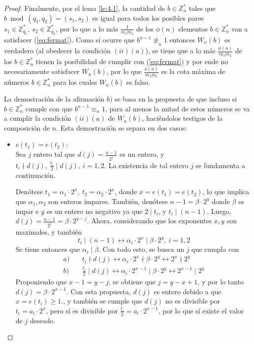 \documentclass[hidelinks, 12pt]{article}
\newcommand{\Zs}{\mathbb{Z}^*}
\newcommand{\llra}{\longleftrightarrow}
\begin{document}
\begin{proof}
    Finalmente, por el lema \ref{le:4.1}, la cantidad de $b\in\Zs_n$ tales que $b\bmod(q_1,q_2)=(s_1,s_2)$ es igual para todos los posibles pares $s_1\in\Zs_{q_1},~s_2\in\Zs_{q_2}$, por lo que a lo más $\frac{1}{m_1m_2}$ de los $\phi(n)$ elementos $b\in\Zs_n$ van a satisfacer (\ref{eq:fermat}). Como si ocurre que $b^{n-1}\not\equiv_n 1$ entonces $W_n(b)$ es verdadero (al obedecer la condición $(ii)(a)$), se tiene que a lo más $\frac{\phi(n)}{m_1m_2}$ de los $b\in\Zs_n$ tienen la posibilidad de cumplir con (\ref{eq:fermat}) y por ende no necesariamente satisfacer $W_n(b)$, por lo que $\frac{\phi(n)}{m_1m_2}$ es la cota máxima de números $b\in\Zs_n$ para los cuales $W_n(b)$ es falso.

    La demostración de la afirmación $b)$ se basa en la propuesta de que incluso si $b\in\Zs_n$ cumple con que $b^{n-1}\equiv_n 1$, para al menos la mitad de estos números se va a cumplir la condición $(ii)(a)$ de $W_n(b)$, haciéndolos testigos de la composición de $n$. Esta demostración se separa en dos casos:
    \begin{itemize}
        \item $e(t_1)=e(t_2)$: \\
        Sea $j$ entero tal que $d(j)=\frac{n-1}{2^j}$ es un entero, y $t_i\nmid d(j),~\frac{t_i}{2}\mid d(j),~i=1,2$. La existencia de tal entero $j$ se fundamenta a continuación.
        
        Denótese $t_1=\alpha_1\cdot 2^x,~t_2=\alpha_2\cdot 2^x$, donde $x=e(t_1)=e(t_2)$, lo que implica que $\alpha_1,\alpha_2$ son enteros impares. También, denótese $n-1=\beta\cdot 2^y$ donde $\beta$ es impar e $y$ es un entero no negativo ya que $2\mid t_i$, y $t_i\mid(n-1)$. Luego, $d(j)=\frac{n-1}{2^j}=\beta\cdot 2^{y-j}$. Ahora, considerando que los exponentes $x,y$ son maximales, y también
        \[t_i\mid(n-1)\llra\alpha_i\cdot 2^x\mid\beta\cdot 2^y,~i=1,2\] 
        Se tiene entonces que $\alpha_i\mid\beta$. Con todo esto, se busca un $j$ que cumpla con
        \begin{align*}
            a)\quad&t_i\nmid d(j)\llra\alpha_i\cdot 2^x\nmid\beta\cdot 2^y\llra 2^x\nmid 2^y \\
            b)\quad&\frac{t_i}{2}\mid d(j)\llra\alpha_i\cdot 2^{x-1}\mid\beta\cdot 2^y\llra 2^{x-1}\mid 2^y
        \end{align*}
        Proponiendo que $x-1=y-j$, se obtiene que $j=y-x+1$, y por lo tanto $d(j)=\beta\cdot 2^{x-1}$. Con esta propuesta, $d(j)$ es entero debido a que $x=e(t_i)\geq 1$., y también se cumple que $d(j)$ no es divisible por $t_i=a_i\cdot 2^x$, pero sí es divisible por $\frac{t_i}{2}=a_i\cdot 2^{x-1}$, por lo que sí existe el valor de $j$ deseado.


\end{itemize}
\end{proof}
\end{document}
